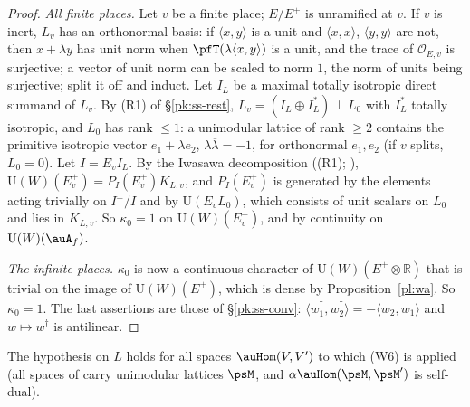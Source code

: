 \documentclass[10pt]{amsart}
\theoremstyle{definition}
\theoremstyle{remark}
\newcommand{\R}{\mathbb R}
\providecommand{\auO}{\mathcal O}
\providecommand{\auU}{\mathrm U}
\providecommand{\aubar}[1]{\overline{#1}}
\begin{document}
\begin{proof}
\emph{All finite places.} Let $v$ be a finite place; $E/E^+$ is unramified at $v$. If $v$ is
inert, $L_v$ has an orthonormal basis: if $\langle x,y\rangle$ is a unit and $\langle x,x\rangle$,
$\langle y,y\rangle$ are not, then $x+\lambda y$ has unit norm when $\pfT(\lambda\langle x,y
\rangle)$ is a unit, and the trace of $\auO_{E,v}$ is surjective; a vector of unit norm can be
scaled to norm $1$, the norm of units being surjective; split it off and induct. Let $I_L$ be a
maximal totally isotropic direct summand of $L_v$. By (R1) of \S\ref{pk:ss-rest},
$L_v=(I_L\oplus I_L^*)\perp L_0$ with $I_L^*$ totally isotropic, and $L_0$ has rank $\le1$: a
unimodular lattice of rank $\ge2$ contains the primitive isotropic vector $e_1+\lambda e_2$,
$\lambda\aubar\lambda=-1$, for orthonormal $e_1,e_2$ (if $v$ splits, $L_0=0$). Let $I=E_vI_L$. By
the Iwasawa decomposition ((R1); \cite[\S3.3.2, p.~51]{TitsCorvallis}), $\auU(W)(E^+_v)=P_I(E^+_v)K_{L,v}$,
and $P_I(E^+_v)$ is generated by the elements acting trivially on $I^\perp/I$ and by
$\auU(E_vL_0)$, which consists of unit scalars on $L_0$ and lies in $K_{L,v}$. So $\kappa_0=1$ on
$\auU(W)(E^+_v)$, and by continuity on $\auU(W)(\auA_f)$.

\emph{The infinite places.} $\kappa_0$ is now a continuous character of $\auU(W)(E^+\otimes\R)$
that is trivial on the image of $\auU(W)(E^+)$, which is dense by Proposition~\ref{pl:wa}. So
$\kappa_0=1$. The last assertions are those of \S\ref{pk:ss-conv}: $\langle w_1^\dagger,w_2^\dagger
\rangle=-\langle w_2,w_1\rangle$ and $w\mapsto w^\dagger$ is antilinear.
\end{proof}
The hypothesis on $L$ holds for all spaces $\auHom(V,V')$ to which (W6) is applied (all spaces of
{\cite[\S14.3]{P46}} carry unimodular lattices $\psM$, and $\alpha\auHom(\psM,\psM')$ is
self-dual).
\end{document}
